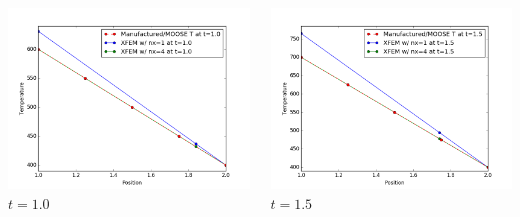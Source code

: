\documentclass[]{beamer}
\begin{document}
\begin{frame}[t]
\begin{columns}
\begin{center}
			\includegraphics[scale=0.17]{figures/1D_rz_ls1mat_u_vs_x_10}\\
			$t=1.0$
			\end{center}
			\begin{center}
			\includegraphics[scale=0.17]{figures/1D_rz_ls1mat_u_vs_x_15}\\
			$t=1.5$			
			
			\null
			

\end{center}
\end{columns}
\end{frame}
\end{document}

